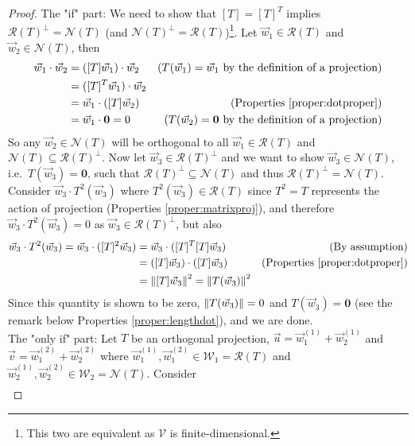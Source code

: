 \begin{proof}
The "if" part: We need to show that $[T] = [T]^T$ implies $\mathcal{R}(T)^\perp = \mathcal{N}(T)$ (and $\mathcal{N}(T)^\perp = \mathcal{R}(T)$)\footnote{This two are equivalent as $\mathcal{V}$ is finite-dimensional.}. Let $\vec{w}_1 \in \mathcal{R}(T)$ and $\vec{w}_2 \in \mathcal{N}(T)$, then 
\begin{align*}
\vec{w}_1 \cdot \vec{w}_2 &= ([T]\vec{w}_1) \cdot \vec{w}_2 & \text{($T(\vec{w}_1) = \vec{w}_1$ by the definition of a projection)} \\
&= ([T]^T\vec{w}_1) \cdot \vec{w}_2 \\
&= \vec{w}_1 \cdot ([T]\vec{w}_2) & \text{(Properties \ref{proper:dotproper})} \\
&= \vec{w}_1 \cdot \textbf{0} = 0 & \text{($T(\vec{w}_2) = \textbf{0}$ by the definition of a projection)}
\end{align*}
So any $\vec{w}_2 \in \mathcal{N}(T)$ will be orthogonal to all $\vec{w}_1 \in \mathcal{R}(T)$ and $\mathcal{N}(T) \subseteq \mathcal{R}(T)^\perp$. Now let $\vec{w}_3 \in \mathcal{R}(T)^\perp$ and we want to show $\vec{w}_3 \in \mathcal{N}(T)$, i.e.\ $T(\vec{w}_3) = \textbf{0}$, such that $\mathcal{R}(T)^\perp \subseteq \mathcal{N}(T)$ and thus $\mathcal{R}(T)^\perp = \mathcal{N}(T)$. Consider $\vec{w}_3 \cdot T^2(\vec{w}_3)$ where $T^2(\vec{w}_3) \in \mathcal{R}(T)$ since $T^2 = T$ represents the action of projection (Properties \ref{proper:matrixproj}), and therefore $\vec{w}_3 \cdot T^2(\vec{w}_3) = 0$ as $\vec{w}_3 \in \mathcal{R}(T)^\perp$, but also
\begin{align*}
\vec{w}_3 \cdot T^2(\vec{w}_3) = \vec{w}_3 \cdot ([T]^2\vec{w}_3) &= \vec{w}_3 \cdot ([T]^T[T]\vec{w}_3) & \text{(By assumption)} \\
&= ([T]\vec{w}_3) \cdot ([T]\vec{w}_3) & \text{(Properties \ref{proper:dotproper})} \\
&= \norm{[T]\vec{w}_3}^2 = \norm{T(\vec{w}_3)}^2 
\end{align*}
Since this quantity is shown to be zero, $\norm{T(\vec{w}_3)} = 0$ and $T(\vec{w}_3) = \textbf{0}$ (see the remark below Properties \ref{proper:lengthdot}), and we are done.
\\
The "only if" part: Let $T$ be an orthogonal projection, $\vec{u} = \vec{w}_1^{(1)} + \vec{w}_2^{(1)}$ and $\vec{v} = \vec{w}_1^{(2)} + \vec{w}_2^{(2)}$ where $\vec{w}_1^{(1)}, \vec{w}_1^{(2)} \in \mathcal{W}_1 = \mathcal{R}(T)$ and $\vec{w}_2^{(1)}, \vec{w}_2^{(2)} \in \mathcal{W}_2 = \mathcal{N}(T)$. Consider 
\begin{align*}

\end{align*}
\end{proof}

